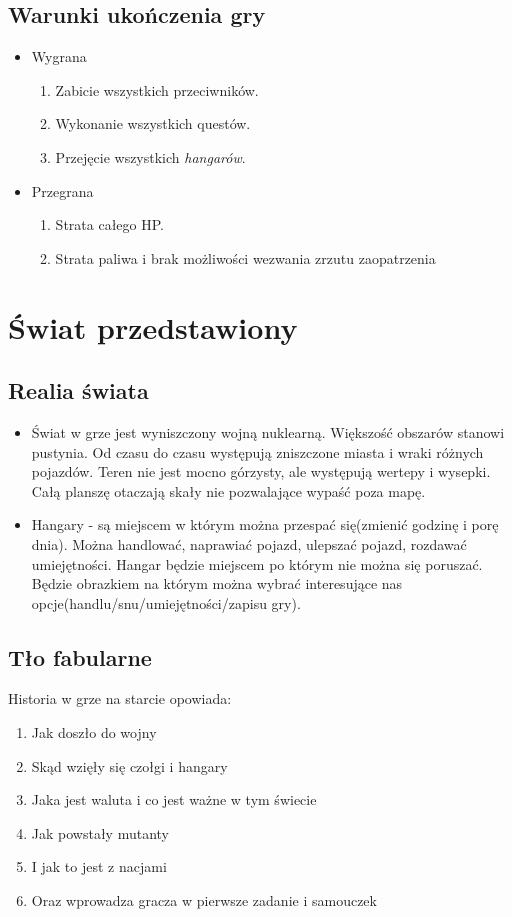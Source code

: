 \documentclass{article}
\begin{document}
    \subsection{Warunki ukończenia gry}
\begin{itemize}
    \item Wygrana
    \begin{enumerate}
        \item Zabicie wszystkich przeciwników.
        \item Wykonanie wszystkich questów.
        \item Przejęcie wszystkich \emph{hangarów}.
    \end{enumerate}
    \item Przegrana
    \begin{enumerate}
        \item Strata całego HP.
        \item Strata paliwa i brak możliwości wezwania zrzutu zaopatrzenia
    \end{enumerate}
\end{itemize}
    
    \newpage
    
   
\section{Świat przedstawiony}
    \subsection{Realia świata}
    \begin{itemize}
 

    \item Świat w grze jest wyniszczony wojną nuklearną. Większość obszarów stanowi pustynia. Od czasu do czasu występują zniszczone miasta i wraki różnych pojazdów. Teren nie jest mocno górzysty, ale występują wertepy i wysepki. Całą planszę otaczają skały nie pozwalające wypaść poza mapę. 
\item Hangary - są miejscem w którym można przespać się(zmienić godzinę i porę dnia). Można handlować, naprawiać pojazd, ulepszać pojazd, rozdawać umiejętności. Hangar będzie miejscem po którym nie można się poruszać. Będzie obrazkiem na którym można wybrać interesujące nas opcje(handlu/snu/umiejętności/zapisu gry).
    \end{itemize}
    \subsection{Tło fabularne}
    Historia w grze na starcie opowiada: 
    \begin{enumerate}
        \item Jak doszło do wojny
        \item Skąd wzięły się czołgi i hangary
        \item Jaka jest waluta i co jest ważne w tym świecie
        \item Jak powstały mutanty
        \item I jak to jest z nacjami
        \item Oraz wprowadza gracza w pierwsze zadanie i samouczek
    \end{enumerate}
\end{document}
